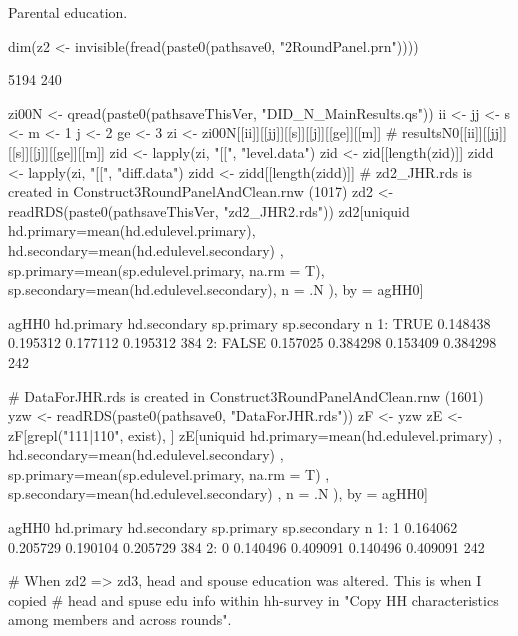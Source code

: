 Parental education.
\begin{Schunk}
\begin{Sinput}
dim(z2 <- invisible(fread(paste0(pathsave0, "2RoundPanel.prn"))))
\end{Sinput}
\begin{Soutput}
[1] 5194  240
\end{Soutput}
\begin{Sinput}
zi00N <- qread(paste0(pathsaveThisVer, "DID_N_MainResults.qs"))
ii <- jj <- s <- m <- 1
j <- 2
ge <- 3
zi <- zi00N[[ii]][[jj]][[s]][[j]][[ge]][[m]] # resultsN0[[ii]][[jj]][[s]][[j]][[ge]][[m]]
zid <- lapply(zi, "[[", "level.data")
zid <- zid[[length(zid)]]
zidd <- lapply(zi, "[[", "diff.data")
zidd <- zidd[[length(zidd)]]
# zd2_JHR.rds is created in Construct3RoundPanelAndClean.rnw (1017)
zd2 <- readRDS(paste0(pathsaveThisVer, "zd2_JHR2.rds"))
zd2[uniquid %in% zidd[, uniquid] & survey == 1999, .(
    hd.primary=mean(hd.edulevel.primary), hd.secondary=mean(hd.edulevel.secondary)
    , sp.primary=mean(sp.edulevel.primary, na.rm = T), 
    sp.secondary=mean(hd.edulevel.secondary), 
    n = .N
  ), by = agHH0]
\end{Sinput}
\begin{Soutput}
   agHH0 hd.primary hd.secondary sp.primary sp.secondary   n
1:  TRUE   0.148438     0.195312   0.177112     0.195312 384
2: FALSE   0.157025     0.384298   0.153409     0.384298 242
\end{Soutput}
\begin{Sinput}
# DataForJHR.rds is created in Construct3RoundPanelAndClean.rnw (1601)
yzw <- readRDS(paste0(pathsave0, "DataForJHR.rds"))
zF <- yzw
zE <- zF[grepl("111|110", exist), ]
zE[uniquid %in% zidd[, uniquid] & survey == 1999, .(
    hd.primary=mean(hd.edulevel.primary)
    , hd.secondary=mean(hd.edulevel.secondary)
    , sp.primary=mean(sp.edulevel.primary, na.rm = T)
    , sp.secondary=mean(hd.edulevel.secondary)
    , n = .N
  ), by = agHH0]
\end{Sinput}
\begin{Soutput}
   agHH0 hd.primary hd.secondary sp.primary sp.secondary   n
1:     1   0.164062     0.205729   0.190104     0.205729 384
2:     0   0.140496     0.409091   0.140496     0.409091 242
\end{Soutput}
\begin{Sinput}
# When zd2 => zd3, head and spouse education was altered. This is when I copied 
# head and spuse edu info within hh-survey in "Copy HH characteristics among members and across rounds".
\end{Sinput}
\end{Schunk}





